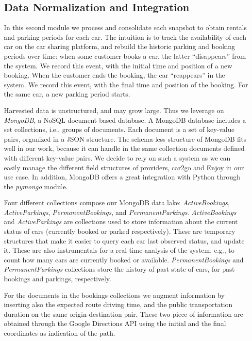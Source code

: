\subsection{Data Normalization and Integration}

In this second module we process and consolidate each snapshot to obtain rentals and parking periods for each car. The intuition is to track the availability of each car on the car sharing platform, and rebuild the historic parking and booking periods over time: when some customer books a car, the latter ``disappears'' from the system. We record this event, with the initial time and position of a new booking. When the customer ends the booking, the car ``reappears'' in the system. We record this event, with the final time and position of the booking. For the same car, a new parking period starts.

Harvested data is unstructured, and may grow large. Thus we leverage on \textit{MongoDB}, a NoSQL document-based database. A MongoDB database includes a set collections, i.e., groups of documents. Each document is a set of key-value pairs, organized in a JSON structure. The schema-less structure of MongoDB fits well in our work, because it can handle in the same collection documents defined with different key-value pairs. We decide to rely on such a system as we can easily manage the different field structures of providers, car2go and Enjoy in our use case. In addition, MongoDB offers a great integration with Python through the \textit{pymongo} module.

Four different collections compose our MongoDB data lake:  \textit{ActiveBookings}, \textit{ActiveParkings}, \textit{PermanentBookings}, and \textit{PermanentParkings}. 
\textit{ActiveBookings} and \textit{ActiveParkings} are collections used to store information about the current status of cars (currently booked or parked respectively). These are temporary structures that make it easier to query each car last observed status, and update it. These are also instrumentals for a real-time analysis of the system, e.g., to count how many cars are currently booked or available.
\textit{PermanentBookings} and \textit{PermanentParkings} collections store the history of past state of cars, for past bookings and parkings, respectively.

For the documents in the bookings collections we augment information by inserting also the expected route driving time, and the public transportation duration on the same origin-destination pair. These two piece of information are obtained through the Google Directions API using the initial and the final coordinates as indication of the path.

